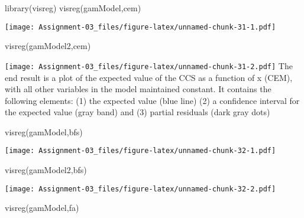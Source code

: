 \documentclass[
]{article}
\newenvironment{Shaded}{\begin{snugshade}}{\end{snugshade}}
\newcommand{\FunctionTok}[1]{\textcolor[rgb]{0.00,0.00,0.00}{#1}}
\newcommand{\NormalTok}[1]{#1}
\newcommand{\StringTok}[1]{\textcolor[rgb]{0.31,0.60,0.02}{#1}}
\begin{document}
\begin{Shaded}
\begin{Highlighting}[]
\FunctionTok{library}\NormalTok{(visreg)}
\FunctionTok{visreg}\NormalTok{(gamModel,}\StringTok{\textquotesingle{}cem\textquotesingle{}}\NormalTok{)}
\end{Highlighting}
\end{Shaded}

\texttt{[image: Assignment-03\_files/figure-latex/unnamed-chunk-31-1.pdf]}

\begin{Shaded}
\begin{Highlighting}[]
\FunctionTok{visreg}\NormalTok{(gamModel2,}\StringTok{\textquotesingle{}cem\textquotesingle{}}\NormalTok{) }
\end{Highlighting}
\end{Shaded}

\texttt{[image: Assignment-03\_files/figure-latex/unnamed-chunk-31-2.pdf]}
The end result is a plot of the expected value of the CCS as a function
of x (CEM), with all other variables in the model maintained constant.
It contains the following elements: (1) the expected value (blue line)
(2) a confidence interval for the expected value (gray band) and (3)
partial residuals (dark gray dots)

\begin{Shaded}
\begin{Highlighting}[]
\FunctionTok{visreg}\NormalTok{(gamModel,}\StringTok{\textquotesingle{}bfs\textquotesingle{}}\NormalTok{) }
\end{Highlighting}
\end{Shaded}

\texttt{[image: Assignment-03\_files/figure-latex/unnamed-chunk-32-1.pdf]}

\begin{Shaded}
\begin{Highlighting}[]
\FunctionTok{visreg}\NormalTok{(gamModel2,}\StringTok{\textquotesingle{}bfs\textquotesingle{}}\NormalTok{) }
\end{Highlighting}
\end{Shaded}

\texttt{[image: Assignment-03\_files/figure-latex/unnamed-chunk-32-2.pdf]}

\begin{Shaded}
\begin{Highlighting}[]
\FunctionTok{visreg}\NormalTok{(gamModel,}\StringTok{\textquotesingle{}fa\textquotesingle{}}\NormalTok{) }
\end{Highlighting}
\end{Shaded}
\end{document}
